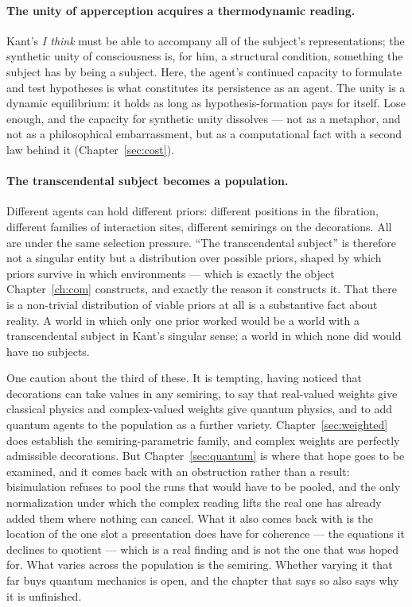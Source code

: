 \paragraph{The unity of apperception acquires a thermodynamic reading.}
Kant's \emph{I think} must be able to accompany all of the
subject's representations; the synthetic unity of consciousness is,
for him, a structural condition, something the subject has by being
a subject.
Here, the agent's continued capacity to formulate and test
hypotheses is what constitutes its persistence as an agent.
The unity is a dynamic equilibrium: it holds as long as
hypothesis-formation pays for itself.
Lose enough, and the capacity for synthetic unity dissolves --- not
as a metaphor, and not as a philosophical embarrassment, but as a
computational fact with a second law behind it
(Chapter~\ref{sec:cost}).

\paragraph{The transcendental subject becomes a population.}
Different agents can hold different priors: different positions in
the fibration, different families of interaction sites, different
semirings on the decorations.
All are under the same selection pressure.
``The transcendental subject'' is therefore not a singular entity
but a distribution over possible priors, shaped by which priors
survive in which environments --- which is exactly the object
Chapter~\ref{ch:com} constructs, and exactly the reason it
constructs it.
That there is a non-trivial distribution of viable priors at all is
a substantive fact about reality.
A world in which only one prior worked would be a world with a
transcendental subject in Kant's singular sense; a world in which
none did would have no subjects.

One caution about the third of these.
It is tempting, having noticed that decorations can take values in
any semiring, to say that real-valued weights give classical
physics and complex-valued weights give quantum physics, and to add
quantum agents to the population as a further variety.
Chapter~\ref{sec:weighted} does establish the semiring-parametric
family, and complex weights are perfectly admissible decorations.
But Chapter~\ref{sec:quantum} is where that hope goes to be
examined, and it comes back with an obstruction rather than a
result: bisimulation refuses to pool the runs that would have to be
pooled, and the only normalization under which the complex reading
lifts the real one has already added them where nothing can cancel.
What it also comes back with is the location of the one slot a
presentation does have for coherence --- the equations it declines
to quotient --- which is a real finding and is not the one that was
hoped for.
What varies across the population is the semiring.
Whether varying it that far buys quantum mechanics is open, and the
chapter that says so also says why it is unfinished.


